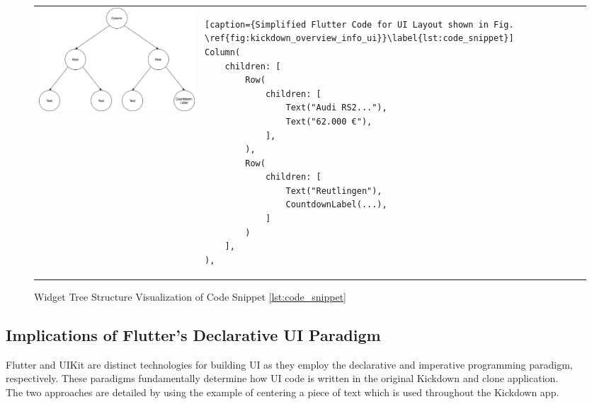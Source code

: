 \begin{figure}[htbp]
    \begin{tabular}{p{}p{}}
        \begin{minipage}{.45\textwidth}
        \centering
        \includegraphics[width=\linewidth]{images/Kickdown_overview_info_ui_tree.eps}
        \caption{Widget Tree Structure Visualization of Code Snippet \ref{lst:code_snippet}}
        \label{fig:kickdown_overview_info_ui_tree}
        \end{minipage}
        &
        \begin{minipage}{.55\textwidth}
            \begin{lstlisting}[caption={Simplified Flutter Code for UI Layout shown in Fig. \ref{fig:kickdown_overview_info_ui}}\label{lst:code_snippet}]
Column(
    children: [
        Row(
            children: [
                Text("Audi RS2..."),
                Text("62.000 €"),
            ],
        ),
        Row(
            children: [
                Text("Reutlingen"),
                CountdownLabel(...),
            ]
        )
    ],
),
            \end{lstlisting}
        \end{minipage}
    \end{tabular}
\end{figure}

\subsection{Implications of Flutter's Declarative UI Paradigm} \label{section::declarative_vs_imperative_ui}
Flutter and UIKit are distinct technologies for building UI as they employ the declarative and imperative programming paradigm, respectively. 
These paradigms fundamentally determine how UI code is written in the  original Kickdown and clone application.\\
The two approaches are detailed by using the example of centering a piece of text which is used throughout the Kickdown app.

